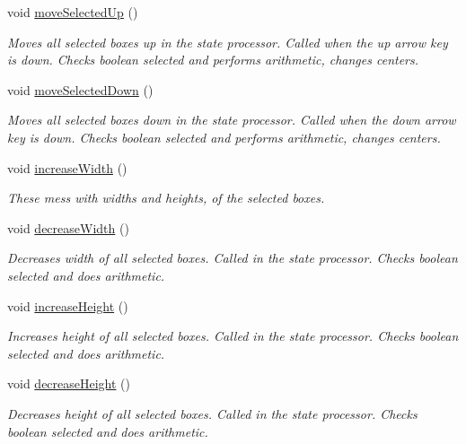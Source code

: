 \begin{DoxyCompactItemize}
\mbox{\label{class_graphics_engine_ab4f08b6ecf4daefa6face72775ea318e}} 
void \hyperlink{class_graphics_engine_ab4f08b6ecf4daefa6face72775ea318e}{move\+Selected\+Up} ()
\begin{DoxyCompactList}\small\item\em Moves all selected boxes up in the state processor. Called when the up arrow key is down. Checks boolean selected and performs arithmetic, changes centers. \end{DoxyCompactList}\item 
\mbox{\label{class_graphics_engine_a6e2faebbfce2dee0bc68386931b529d6}} 
void \hyperlink{class_graphics_engine_a6e2faebbfce2dee0bc68386931b529d6}{move\+Selected\+Down} ()
\begin{DoxyCompactList}\small\item\em Moves all selected boxes down in the state processor. Called when the down arrow key is down. Checks boolean selected and performs arithmetic, changes centers. \end{DoxyCompactList}\item 
void \hyperlink{class_graphics_engine_a6b07e2201e276bb406d3436d382049c9}{increase\+Width} ()
\begin{DoxyCompactList}\small\item\em These mess with widths and heights, of the selected boxes. \end{DoxyCompactList}\item 
\mbox{\label{class_graphics_engine_aeced42d59dd8966281f7cb069ee236fb}} 
void \hyperlink{class_graphics_engine_aeced42d59dd8966281f7cb069ee236fb}{decrease\+Width} ()
\begin{DoxyCompactList}\small\item\em Decreases width of all selected boxes. Called in the state processor. Checks boolean selected and does arithmetic. \end{DoxyCompactList}\item 
\mbox{\label{class_graphics_engine_a75af3db266c0f72e26578cf621a6ac16}} 
void \hyperlink{class_graphics_engine_a75af3db266c0f72e26578cf621a6ac16}{increase\+Height} ()
\begin{DoxyCompactList}\small\item\em Increases height of all selected boxes. Called in the state processor. Checks boolean selected and does arithmetic. \end{DoxyCompactList}\item 
\mbox{\label{class_graphics_engine_a10341af9b8f2ab6e51580ed9fa4c142f}} 
void \hyperlink{class_graphics_engine_a10341af9b8f2ab6e51580ed9fa4c142f}{decrease\+Height} ()
\begin{DoxyCompactList}\small\item\em Decreases height of all selected boxes. Called in the state processor. Checks boolean selected and does arithmetic. \end{DoxyCompactList}\end{DoxyCompactItemize}
